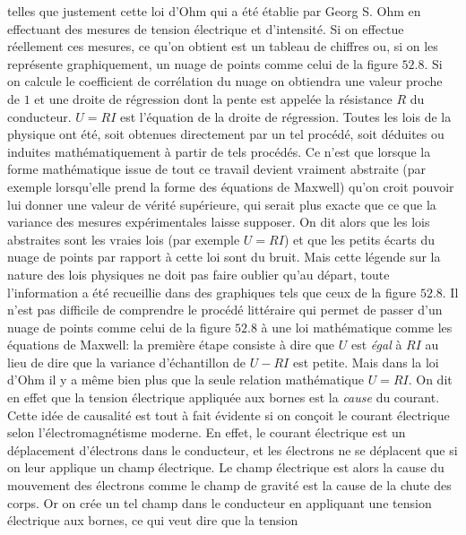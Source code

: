telles que justement cette loi d'Ohm qui a \'et\'e \'etablie par Georg S. 
Ohm en effectuant des mesures de tension \'electrique et d'intensit\'e. 
\medskip 
Si on effectue r\'eellement ces mesures, ce qu'on obtient est un 
tableau de chiffres ou, si on les repr\'esente graphiquement, un nuage 
de points comme celui de la figure $52.8$. Si on calcule le coefficient 
de corr\'elation du nuage on obtiendra une valeur proche de $1$ et une 
droite de r\'egression dont la pente est appel\'ee la r\'esistance $R$ 
du conducteur. $U = RI$ est l'\'equation de la droite de r\'egression. 
\medskip 
Toutes les lois de la physique ont \'et\'e, soit obtenues directement 
par un tel proc\'ed\'e, soit d\'eduites ou induites math\'ematiquement 
\`a partir de tels proc\'ed\'es. Ce n'est que lorsque la forme 
math\'ematique issue de tout ce travail devient vraiment abstraite 
(par exemple lorsqu'elle prend la forme des \'equations de Maxwell) 
qu'on croit pouvoir lui donner une valeur de v\'erit\'e sup\'erieure, 
qui serait plus exacte que ce que la variance des mesures exp\'erimentales 
laisse supposer. On dit alors que les lois abstraites sont les
{\og vraies\fg} lois (par exemple $U=RI$) et que les petits \'ecarts
du nuage de points par rapport \`a cette loi sont {\og du bruit\fg}. 
Mais cette l\'egende sur la nature des lois physiques ne doit pas faire
oublier qu'au d\'epart, toute l'information a \'et\'e recueillie dans
des graphiques tels que ceux de la figure $52.8$. Il n'est pas difficile
de comprendre le proc\'ed\'e litt\'eraire qui permet de passer d'un nuage
de points comme celui de la figure $52.8$ \`a une loi math\'ematique
comme les \'equations de Maxwell: la premi\`ere \'etape consiste \`a
dire que $U$ est {\it \'egal} \`a $RI$ au lieu de dire que la variance
d'\'echantillon de $U - RI$ est petite. 
\medskip 
Mais dans la loi d'Ohm il y a m\^eme bien plus que la seule relation 
math\'ematique $U = RI$. On dit en effet que la tension \'electrique 
appliqu\'ee aux bornes est la {\it cause} du courant. 
\medskip
Cette id\'ee de causalit\'e est tout \`a fait \'evidente si on con\c{c}oit 
le courant \'electrique selon l'\'electromagn\'etisme moderne. En effet, le
courant \'electrique est un d\'eplacement d'\'electrons dans le conducteur, 
et les \'electrons ne se d\'eplacent que si on leur applique un champ 
\'electrique. Le champ \'electrique est alors la cause du mouvement des 
\'electrons comme le champ de gravit\'e est la cause de la chute des 
corps. Or on cr\'ee un tel champ dans le conducteur en appliquant une 
tension \'electrique aux bornes, ce qui veut dire que la tension 

